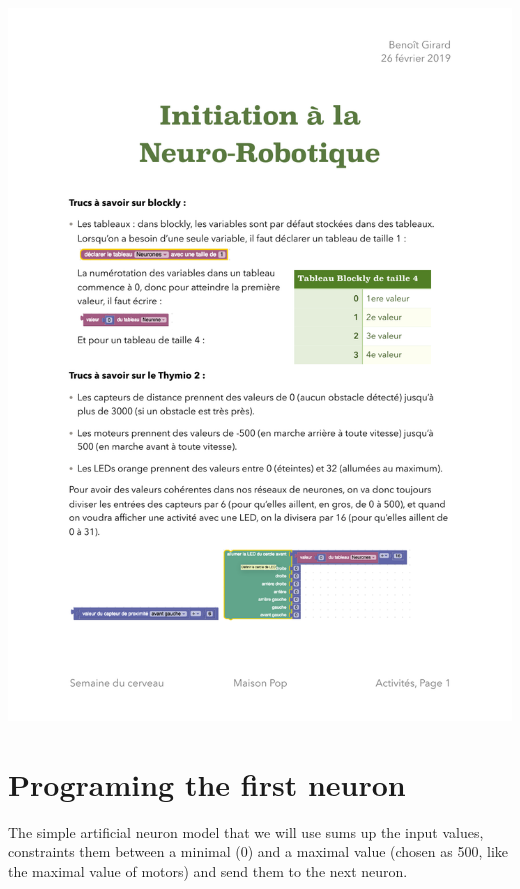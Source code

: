 \documentclass[12pt]{article}
\begin{document}
\includegraphics{../Normalisation.pdf}

\section{Programing the first neuron}

The simple artificial neuron model that we will use sums up the input values, constraints them between a minimal (0) and a maximal value (chosen as 500, like the maximal value of motors) and send them to the next neuron.
\end{document}
